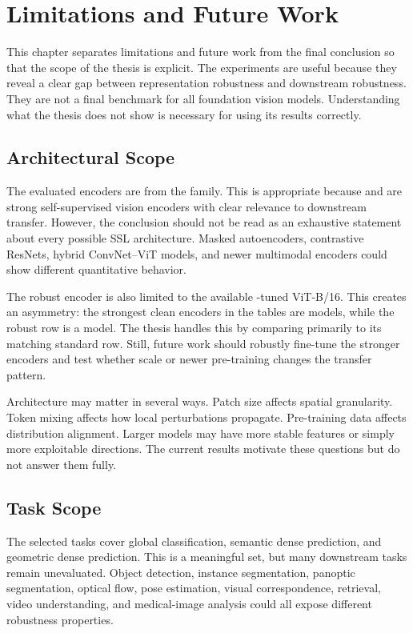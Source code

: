 \chapter{Limitations and Future Work}
\label{chap:limitations-future}

This chapter separates limitations and future work from the final conclusion so that the scope of the thesis is explicit. The experiments are useful because they reveal a clear gap between representation robustness and downstream robustness. They are not a final benchmark for all foundation vision models. Understanding what the thesis does not show is necessary for using its results correctly.

\section{Architectural Scope}

The evaluated encoders are from the \DINO family. This is appropriate because \DINO and \DINOv are strong self-supervised vision encoders with clear relevance to downstream transfer. However, the conclusion should not be read as an exhaustive statement about every possible SSL architecture. Masked autoencoders, contrastive ResNets, hybrid ConvNet--ViT models, and newer multimodal encoders could show different quantitative behavior.

The robust encoder is also limited to the available \DeACL-tuned \DINO ViT-B/16. This creates an asymmetry: the strongest clean encoders in the tables are \DINOv models, while the robust row is a \DINO model. The thesis handles this by comparing \DeACL primarily to its matching standard \DINO row. Still, future work should robustly fine-tune the stronger \DINOv encoders and test whether scale or newer pre-training changes the transfer pattern.

Architecture may matter in several ways. Patch size affects spatial granularity. Token mixing affects how local perturbations propagate. Pre-training data affects distribution alignment. Larger models may have more stable features or simply more exploitable directions. The current results motivate these questions but do not answer them fully.

\section{Task Scope}

The selected tasks cover global classification, semantic dense prediction, and geometric dense prediction. This is a meaningful set, but many downstream tasks remain unevaluated. Object detection, instance segmentation, panoptic segmentation, optical flow, pose estimation, visual correspondence, retrieval, video understanding, and medical-image analysis could all expose different robustness properties.


